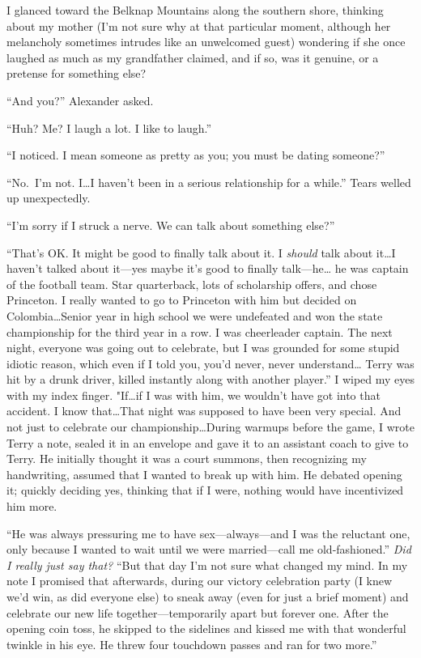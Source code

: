 I glanced toward the Belknap Mountains along the southern shore,
thinking about my mother (I'm not sure why at that particular moment,
although her melancholy sometimes intrudes like an unwelcomed guest)
wondering if she once laughed as much as my grandfather claimed, and if
so, was it genuine, or a pretense for something else?

``And you?'' Alexander asked.

``Huh? Me? I laugh a lot. I like to laugh.''

``I noticed. I mean someone as pretty as you; you must be dating
someone?''

``No.~I'm not. I\ldots I haven't been in a serious relationship for a
while.'' Tears welled up unexpectedly.

``I'm sorry if I struck a nerve. We can talk about something else?''

``That's OK. It might be good to finally talk about it. I \emph{should}
talk about it\ldots I haven't talked about it---yes maybe it's good to
finally talk---he\ldots{} he was captain of the football team. Star
quarterback, lots of scholarship offers, and chose Princeton. I really
wanted to go to Princeton with him but decided on Colombia\ldots Senior
year in high school we were undefeated and won the state championship
for the third year in a row. I was cheerleader captain. The next night,
everyone was going out to celebrate, but I was grounded for some stupid
idiotic reason, which even if I told you, you'd never, never
understand\ldots{} Terry was hit by a drunk driver, killed instantly
along with another player.'' I wiped my eyes with my index finger.
"If\ldots if I was with him, we wouldn't have got into that accident. I
know that\ldots That night was supposed to have been very special. And
not just to celebrate our championship\ldots During warmups before the
game, I wrote Terry a note, sealed it in an envelope and gave it to an
assistant coach to give to Terry. He initially thought it was a court
summons, then recognizing my handwriting, assumed that I wanted to break
up with him. He debated opening it; quickly deciding yes, thinking that
if I were, nothing would have incentivized him more.

``He was always pressuring me to have sex---always---and I was the
reluctant one, only because I wanted to wait until we were
married---call me old-fashioned.'' \emph{Did I really just say that?}
``But that day I'm not sure what changed my mind. In my note I promised
that afterwards, during our victory celebration party (I knew we'd win,
as did everyone else) to sneak away (even for just a brief moment) and
celebrate our new life together---temporarily apart but forever one.
After the opening coin toss, he skipped to the sidelines and kissed me
with that wonderful twinkle in his eye. He threw four touchdown passes
and ran for two more.''

